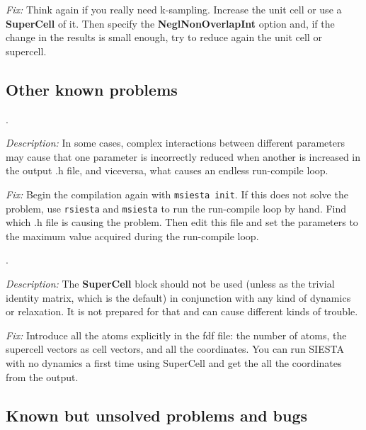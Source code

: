 \begin{description}
{\it Fix:}
Think again if you really need k-sampling.
Increase the unit cell or use a {\bf SuperCell} of it.
Then specify the {\bf NeglNonOverlapInt} option and, if the change in
the results is small enough, try to reduce again the unit cell or supercell.

\end{description}



\subsection{Other known problems}

\begin{description}
\itemsep 10pt
\parsep 0pt

\item[{\bf rrsiesta enters an infinite run-compile loop}].

{\it Description:}
In some cases, complex interactions between different parameters
may cause that one parameter is incorrectly 
reduced when another is increased in the output .h file, 
and viceversa, what causes an endless run-compile loop.

{\it Fix:}
Begin the compilation again with {\tt msiesta init}.
If this does not solve the problem, use {\tt rsiesta} and {\tt msiesta} 
to run the run-compile loop by hand. 
Find which .h file is causing the problem. Then edit
this file and set the parameters to the maximum value acquired
during the run-compile loop.

\item[{\bf Dynamics with a SuperCell}].

{\it Description:}
The {\bf SuperCell} block should not be used (unless as the trivial 
identity matrix, which is the default) in conjunction with any kind
of dynamics or relaxation. It is not prepared for that and can cause 
different kinds of trouble. 

{\it Fix:}
Introduce all the atoms explicitly in the fdf file: the number of atoms,
the supercell vectors as cell vectors, and all the coordinates.
You can run SIESTA with no dynamics a first time using SuperCell
and get the all the coordinates from the output.

\end{description}



\subsection{Known but unsolved problems and bugs}

